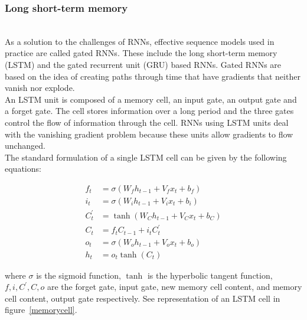 
\subsubsection{Long short-term memory}~\\

As a solution to the challenges of RNNs, effective sequence models used in
practice are called gated RNNs. These include the long short-term memory (LSTM)
and the gated recurrent unit (GRU) based RNNs. Gated RNNs are based on the idea
of creating paths through time that have gradients that neither vanish nor
explode.\\

An LSTM unit is composed of a memory cell, an input gate, an output gate and a
forget gate. The cell stores information over a long period and the three gates
control the flow of information through the cell. RNNs using LSTM units deal
with the vanishing gradient problem because these units allow gradients to flow
unchanged.\cite{doi:10.1162/neco.1997.9.8.1735}\\

The standard formulation of a single LSTM cell can be given by the following
equations:

\begin{align}
  f_t &= \sigma(W_f h_{t-1}+V_f x_t+b_f)\\
  i_t &= \sigma(W_i h_{t-1}+V_i x_t+b_i)\\
  C_t^{'} &= \tanh(W_C h_{t-1}+V_C x_t+b_C)\\
  C_t &= f_t C_{t-1}+i_t C_t^{'}\\
  o_t &= \sigma(W_o h_{t-1}+V_o x_t+b_o)\\
  h_t &= o_t \tanh(C_t)
\end{align}

where $\sigma$ is the sigmoid function, $\tanh$ is the hyperbolic tangent
function, $f,i,C^{'},C,o$ are the forget gate, input gate, new memory cell
content, and memory cell content, output gate respectively. See representation
of an LSTM cell in figure~\ref{memorycell}.

~\\
